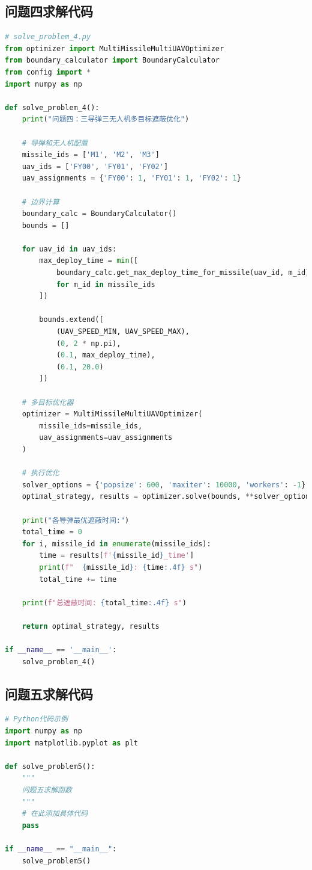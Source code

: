 \documentclass[fontset=SimSun]{ctexart}
\begin{document}
\subsection{问题四求解代码}

\begin{lstlisting}[language=Python, caption=问题四求解代码]
# solve_problem_4.py
from optimizer import MultiMissileMultiUAVOptimizer
from boundary_calculator import BoundaryCalculator
from config import *
import numpy as np

def solve_problem_4():
    print("问题四：三导弹三无人机多目标遮蔽优化")
    
    # 导弹和无人机配置
    missile_ids = ['M1', 'M2', 'M3']
    uav_ids = ['FY00', 'FY01', 'FY02']
    uav_assignments = {'FY00': 1, 'FY01': 1, 'FY02': 1}
    
    # 边界计算
    boundary_calc = BoundaryCalculator()
    bounds = []
    
    for uav_id in uav_ids:
        max_deploy_time = min([
            boundary_calc.get_max_deploy_time_for_missile(uav_id, m_id) 
            for m_id in missile_ids
        ])
        
        bounds.extend([
            (UAV_SPEED_MIN, UAV_SPEED_MAX),
            (0, 2 * np.pi),
            (0.1, max_deploy_time),
            (0.1, 20.0)
        ])
    
    # 多目标优化器
    optimizer = MultiMissileMultiUAVOptimizer(
        missile_ids=missile_ids,
        uav_assignments=uav_assignments
    )
    
    # 执行优化
    solver_options = {'popsize': 600, 'maxiter': 10000, 'workers': -1}
    optimal_strategy, results = optimizer.solve(bounds, **solver_options)
    
    print("各导弹最优遮蔽时间:")
    total_time = 0
    for i, missile_id in enumerate(missile_ids):
        time = results[f'{missile_id}_time']
        print(f"  {missile_id}: {time:.4f} s")
        total_time += time
    
    print(f"总遮蔽时间: {total_time:.4f} s")
    
    return optimal_strategy, results

if __name__ == '__main__':
    solve_problem_4()
\end{lstlisting}

\subsection{问题五求解代码}

\begin{lstlisting}[language=Python, caption=问题五求解代码]
# Python代码示例
import numpy as np
import matplotlib.pyplot as plt

def solve_problem5():
    """
    问题五求解函数
    """
    # 在此添加具体代码
    pass

if __name__ == "__main__":
    solve_problem5()
\end{lstlisting}


\end{document}

